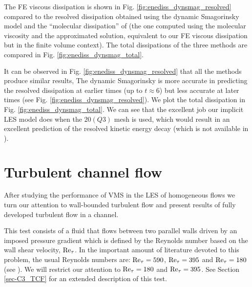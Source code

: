 The FE viscous dissipation is shown in Fig. \ref{fig:enediss_dynsmag_resolved} compared to the resolved dissipation obtained using the dynamic Smagorinsky model \cite{fauconnier_construction_2009} and the ``molecular dissipation'' of \cite{hickel_adaptive_2006} (the one computed using the molecular viscosity and the approximated solution, equivalent to our FE viscous dissipation but in the finite volume context). The total dissipations of the three methods are compared in Fig. \ref{fig:enediss_dynsmag_total}. 


It can be observed in Fig. \ref{fig:enediss_dynsmag_resolved} that all the methods produce similar results, %
The dynamic Smagorinsky is more accurate in predicting the resolved dissipation at earlier times (up to $t\approx{}6$) but less accurate at later times (see Fig. \ref{fig:enediss_dynsmag_resolved}). 
We plot the total dissipation in Fig. \ref{fig:enediss_dynsmag_total}. We can see that the excellent job our implicit LES model does when the $20 (Q3)$ mesh is used, which would result in an excellent prediction of the resolved kinetic energy decay (which is not available in \cite{hickel_adaptive_2006}). 

\section{Turbulent channel flow}
\label{sec-C4_TCF}
After studying the performance of VMS in the LES of homogeneous flows we turn our attention to wall-bounded turbulent flow and present results of fully developed turbulent flow in a channel.

This test consists of a fluid that flows between two parallel walls driven by an imposed pressure gradient which is defined by the Reynolds number based on the wall shear velocity, ${\rm Re}_\tau$. In the important amount of literature devoted to this problem, the usual Reynolds numbers are: ${\rm Re}_\tau=590$, ${\rm Re}_\tau=395$  and ${\rm Re}_\tau=180$ (see \cite{bazilevs_variational_2007, Calderer2013, gamnitzer_time-dependent_2010, gravemeier_algebraic_2010, gullbrand_effect_2003, hughes_large_2001, john_variants_2008, kim_turbulence_1987, masud_variational_2011, moser_direct_1999}). We will restrict our attention to ${\rm Re}_\tau=180$ and ${\rm Re}_\tau=395$. See Section \ref{sec-C3_TCF} for an extended description of this test.

